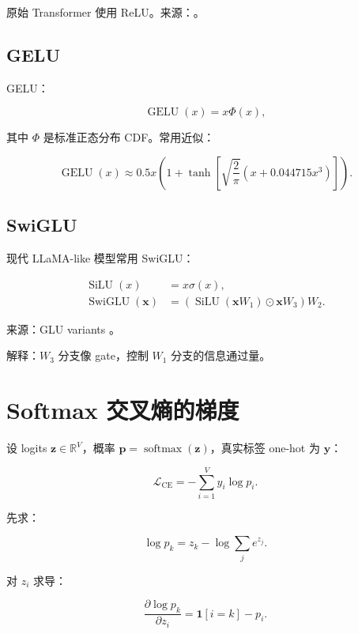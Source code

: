 \documentclass[UTF8,12pt]{ctexart}
\newcommand{\R}{\mathbb{R}}
\newcommand{\1}{\mathbf{1}}
\newcommand{\softmax}{\operatorname{softmax}}
\newcommand{\GELU}{\operatorname{GELU}}
\newcommand{\SiLU}{\operatorname{SiLU}}
\newcommand{\SwiGLU}{\operatorname{SwiGLU}}
\begin{document}
原始 Transformer 使用 ReLU。来源：\cite{vaswani2017attention}。

\subsection{GELU}

GELU：

\begin{equation}
\GELU(x)
=x\Phi(x),
\end{equation}

其中 $\Phi$ 是标准正态分布 CDF。常用近似：

\begin{equation}
\GELU(x)
\approx
0.5x\left(1+\tanh\left[\sqrt{\frac{2}{\pi}}\left(x+0.044715x^3\right)\right]\right).
\end{equation}

\subsection{SwiGLU}

现代 LLaMA-like 模型常用 SwiGLU：

\begin{align}
\SiLU(x)&=x\sigma(x),\\
\SwiGLU(\bm{x})
&=\left(\SiLU(\bm{x}W_1)\odot \bm{x}W_3\right)W_2.
\label{eq:swiglu}
\end{align}

来源：GLU variants \cite{shazeer2020glu}。

解释：$W_3$ 分支像 gate，控制 $W_1$ 分支的信息通过量。

\section{Softmax 交叉熵的梯度}

设 logits $\bm{z}\in\R^V$，概率 $\bm{p}=\softmax(\bm{z})$，真实标签 one-hot 为 $\bm{y}$：

\begin{equation}
\mathcal{L}_{\mathrm{CE}}
=-\sum_{i=1}^{V}y_i\log p_i.
\end{equation}

先求：

\begin{equation}
\log p_k
=z_k-\log\sum_j e^{z_j}.
\end{equation}

对 $z_i$ 求导：

\begin{equation}
\frac{\partial \log p_k}{\partial z_i}
=\1[i=k]-p_i.
\end{equation}
\end{document}

